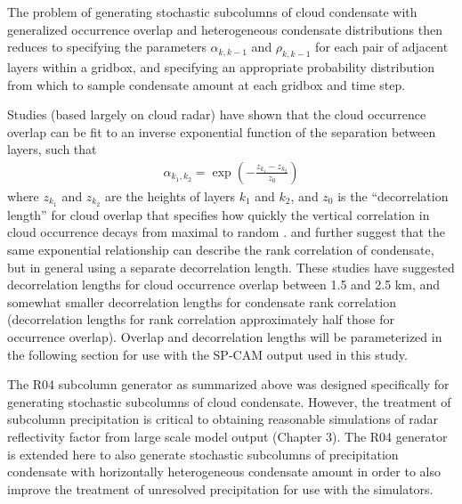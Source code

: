 The problem of generating stochastic subcolumns of cloud condensate with
generalized occurrence overlap and heterogeneous condensate
distributions then reduces to specifying the parameters
\(\alpha_{k, k-1}\) and \(\rho_{k, k-1}\) for each pair of adjacent
layers within a gridbox, and specifying an appropriate probability
distribution from which to sample condensate amount at each gridbox and
time step.

Studies (based largely on cloud radar) have shown that the cloud
occurrence overlap can be fit to an inverse exponential function of the
separation between layers, such that \begin{equation}\begin{gathered} 
    \alpha_{k_1, k_2} = \exp\left(-\frac{z_{k_1} - z_{k_2}}{z_0}\right) 
\end{gathered}\label{eq:alpha_exponential}\end{equation} where
\(z_{k_1}\) and \(z_{k_2}\) are the heights of layers \(k_1\) and
\(k_2\), and \(z_0\) is the ``decorrelation length'' for cloud overlap
that specifies how quickly the vertical correlation in cloud occurrence
decays from maximal to random
\citep{hogan_and_illingworth_2000, mace_and_benson-troth_2002, raisanen_et_al_2004, pincus_et_al_2005, barker_2008, tompkins_and_digiuseppe_2015}.
\citet{raisanen_et_al_2004} and \citet{pincus_et_al_2005} further
suggest that the same exponential relationship can describe the rank
correlation of condensate, but in general using a separate decorrelation
length. These studies have suggested decorrelation lengths for cloud
occurrence overlap between 1.5 and 2.5 km, and somewhat smaller
decorrelation lengths for condensate rank correlation (decorrelation
lengths for rank correlation approximately half those for occurrence
overlap). Overlap and decorrelation lengths will be parameterized in the
following section for use with the SP-CAM output used in this study.

The R04 subcolumn generator as summarized above was designed
specifically for generating stochastic subcolumns of cloud condensate.
However, the treatment of subcolumn precipitation is critical to
obtaining reasonable simulations of radar reflectivity factor from large
scale model output (Chapter 3). The R04 generator is extended here to
also generate stochastic subcolumns of precipitation condensate with
horizontally heterogeneous condensate amount in order to also improve
the treatment of unresolved precipitation for use with the simulators.

